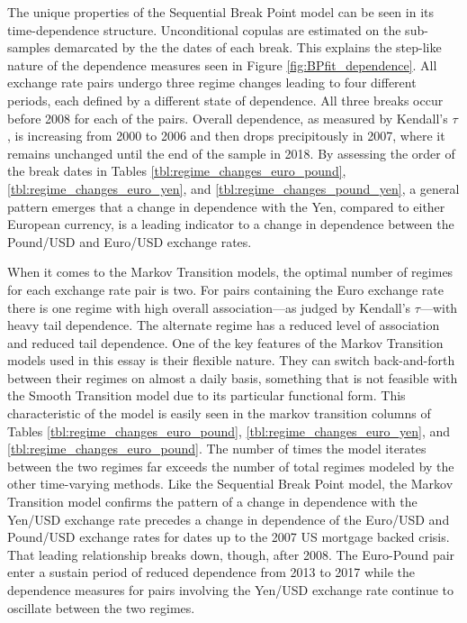 \documentclass[12pt]{article}
\begin{document}
The unique properties of the Sequential Break Point model can be seen in its time-dependence structure. Unconditional copulas are estimated on the sub-samples demarcated by the the dates of each break. This explains the step-like nature of the dependence measures seen in Figure \ref{fig:BPfit_dependence}. All exchange rate pairs undergo three regime changes leading to four different periods, each defined by a different state of dependence. All three breaks occur before 2008 for each of the pairs. Overall dependence, as measured by Kendall's $\tau$, is increasing from 2000 to 2006 and then drops precipitously in 2007, where it remains unchanged until the end of the sample in 2018. By assessing the order of the break dates in Tables \ref{tbl:regime_changes_euro_pound}, \ref{tbl:regime_changes_euro_yen}, and \ref{tbl:regime_changes_pound_yen}, a general pattern emerges that a change in dependence with the Yen, compared to either European currency, is a leading indicator to a change in dependence between the Pound/USD and Euro/USD exchange rates.

When it comes to the Markov Transition models, the optimal number of regimes for each exchange rate pair is two. For pairs containing the Euro exchange rate there is one regime with high overall association---as judged by Kendall's $\tau$---with heavy tail dependence. The alternate regime has a reduced level of association and reduced tail dependence. One of the key features of the Markov Transition models used in this essay is their flexible nature. They can switch back-and-forth between their regimes on almost a daily basis, something that is not feasible with the Smooth Transition model due to its particular functional form. This characteristic of the model is easily seen in the markov transition columns of Tables \ref{tbl:regime_changes_euro_pound}, \ref{tbl:regime_changes_euro_yen}, and \ref{tbl:regime_changes_euro_pound}. The number of times the model iterates between the two regimes far exceeds the number of total regimes modeled by the other time-varying methods. Like the Sequential Break Point model, the Markov Transition model confirms the pattern of a change in dependence with the Yen/USD exchange rate precedes a change in dependence of the Euro/USD and Pound/USD exchange rates for dates up to the 2007 US mortgage backed crisis. That leading relationship breaks down, though, after 2008. The Euro-Pound pair enter a sustain period of reduced dependence from 2013 to 2017 while the dependence measures for pairs involving the Yen/USD exchange rate continue to oscillate between the two regimes.
\end{document}
